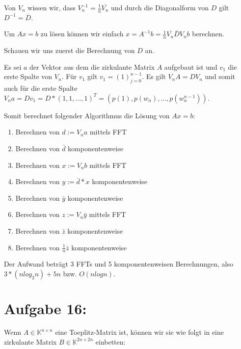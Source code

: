 \documentclass[]{article}
\begin{document}
Von $V_n$ wissen wir, dass $V_n^{-1} = \frac{1}{n} \overline{V_n}$ und durch die Diagonalform von $D$ gilt $D^{-1}=\overline{D}$.

Um $Ax=b$ zu lösen können wir einfach $x = A^{-1}b = \frac{1}{n} \overline{V_n} \bar{D}V_nb$ berechnen.

Schauen wir uns zuerst die Berechnung von $D$ an.

Es sei $a$ der Vektor aus dem die zirkulante Matrix $A$ aufgebaut ist und $v_1$ die erste Spalte von $V_n$. Für $v_1$ gilt $v_1 = (1)_{j=0}^{n-1}$. Es gilt $V_nA = DV_n$ und somit auch für die erste Spalte $V_na = Dv_1 = D*(1, 1, ..., 1)^T = (p(1), p(w_n), ..., p(w_n^{n-1}))$.

Somit berechnet folgender Algorithmus die Lösung von $Ax=b$:

\begin{enumerate}
	\item Berechnen von $d:=V_na$ mittels FFT
	\item Berechnen von $\bar{d}$ komponentenweise
	\item Berechnen von $x:=V_nb$ mittels FFT
	\item Berechnen von $y:=\bar{d}*x$ komponentenweise
	\item Berechnen von $\bar{y}$ komponentenweise
	\item Berechnen von $z:=V_n\bar{y}$ mittels FFT
	\item Berechnen von $\bar{z}$ komponentenweise
	\item Berechnen von $\frac{1}{n}\bar{z}$ komponentenweise
\end{enumerate}

Der Aufwand beträgt 3 FFTs und 5 komponentenweisen Berechnungen, also $3*(n log_2 n) + 5n$ bzw. $O(n log n)$.

\section{Aufgabe 16:}
Wenn $A \in \mathbb{K}^{n\times n}$ eine Toeplitz-Matrix ist, können wir sie wie folgt in eine zirkulante Matrix $B \in \mathbb{K}^{2n\times 2n}$ einbetten:
\end{document}
